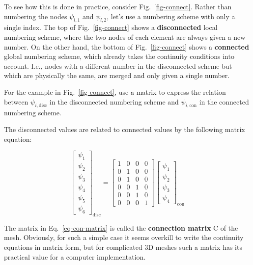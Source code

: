 To see how this is done in practice, consider Fig.~\ref{fig-connect}. Rather than numbering the nodes $\psi_{l,1}$ and $\psi_{l,2}$, let's use a numbering scheme with only a single index. The top of Fig.~\ref{fig-connect} shows a \textbf{disconnected} local numbering scheme, where the two nodes of each element are always given a new number. On the other hand, the bottom of Fig.~\ref{fig-connect} shows a \textbf{connected} global numbering scheme, which already takes the continuity conditions into account. I.e., nodes with a different number in the disconnected scheme but which are physically the same, are merged and only given a single number.

\begin{cue}
For the example in Fig.~\ref{fig-connect}, use a matrix to express the relation between $\psi_{i, \mathrm{disc}}$ in the disconnected numbering scheme and  $\psi_{i, \mathrm{con}}$ in the connected numbering scheme.
\end{cue}
  
The disconnected values are related to connected values by the following matrix equation:

\begin{equation}
\begin{bmatrix}
\psi_1 \\ \psi_2 \\ \psi_3 \\ \psi_4 \\ \psi_5 \\ \psi_6
\end{bmatrix}_{\mathrm{disc}}
=
\begin{bmatrix}
1 & 0 & 0 & 0  \\ 
0 & 1 & 0 & 0  \\   
0 & 1 & 0 & 0  \\ 
0 & 0 & 1 & 0  \\   
0 & 0 & 1 & 0  \\  
0 & 0 & 0 & 1  
\end{bmatrix}
\begin{bmatrix}
\psi_1 \\ \psi_2 \\ \psi_3 \\ \psi_4
\end{bmatrix}_{\mathrm{con}}
\label{eq-con-matrix}
\end{equation} 

The matrix in Eq.~\ref{eq-con-matrix} is called the \textbf{connection matrix} {\mathbf C} of the mesh. Obviously, for such a simple case it seems overkill to write the continuity equations in matrix form, but for complicated 3D meshes such a matrix has its practical value for a computer implementation.

